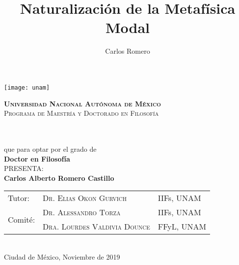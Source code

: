 \documentclass[12pt,letterpaper]{book} %
\author{Carlos Romero}
\title{Naturalización de la Metafísica Modal}
\begin{document}
\frontmatter

\begin{titlepage}
\begin{tcolorbox}[enhanced,spread=1pt,interior style={top color=white,bottom color=white}
]
	\vspace{3cm}
	\begin{center}
	\texttt{[image: unam]}
	\end{center}
	\begin{minipage}[c][0.1\textheight][t]{1\textwidth}
		\begin{center}
			\vspace{.7cm}
			{\sffamily\Large \bfseries \scshape {Universidad Nacional Aut\'onoma de M\'exico}}\\
			\vspace{.2cm}
			{\sffamily\scshape Programa de Maestría y Doctorado en Filosofía}
		\end{center}
	\end{minipage}
	\begin{minipage}[c][0.6\textheight][t]{1\textwidth}
		\begin{center}
			\vspace{1.7cm}
			{\sffamily\LARGE\scshape\bfseries {}}\\
			\vspace{1.7cm}
			  \\%
			{\sffamily que para optar por el grado de} \\[5pt]
			{\sffamily \large \textbf{Doctor en Filosof\'ia}}\\[40pt]            
			{\sffamily PRESENTA:}\\[5pt]
			{\sffamily \large \textbf{Carlos Alberto Romero Castillo}}\\
			\vspace{1cm}
				\begin{tabular}{l l l}
				{\sffamily Tutor:} & {\sffamily\scshape Dr. Elias Okon Gurvich} & {\sffamily\small IIFs, UNAM}\\
				\multirow{2}{*}{\sffamily Comit\'e:} & {\sffamily\scshape Dr. Alessandro Torza} & {\sffamily\small IIFs, UNAM}\\
				& {\sffamily\scshape Dra. Lourdes Valdivia Dounce} & {\sffamily\small FFyL, UNAM}\\
				\end{tabular}	\\
			\vspace{0.5cm}
			{\sffamily Ciudad de M\'exico,}{ }{\sffamily Noviembre de 2019} 	
		\end{center}
	\end{minipage}
\end{tcolorbox}
\end{titlepage}
\end{document}
